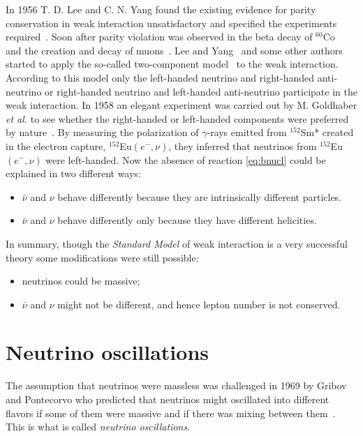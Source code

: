 In 1956 T. D. Lee and C. N. Yang found the existing evidence for parity conservation in weak interaction unsatisfactory and specified the experiments required~\cite{Lee56}. Soon after parity violation was observed in the beta decay of $^{60}$Co~\cite{Wu57} and the creation and decay of muons~\cite{Gar57,Fri57}. Lee and Yang~\cite{Lee57} and some other authors~\cite{Sal57,Lan57} started to apply the so-called two-component model~\cite{Wey29} to the weak interaction. According to this model only the left-handed neutrino and right-handed anti-neutrino or right-handed neutrino and left-handed anti-neutrino participate in the weak interaction. In 1958 an elegant experiment was carried out by M. Goldhaber \textit{et al.} to see whether the right-handed or left-handed components were preferred by nature~\cite{Gol58}. By measuring the polarization of $\gamma$-rays emitted from $^{152}$Sm* created in the electron capture, $^{152}$Eu$(e^-,\nu)$, they inferred that neutrinos from $^{152}$Eu$(e^-,\nu)$ were left-handed. Now the absence of reaction \ref{eq:bnucl} could be explained in two different ways:
\begin{itemize}
\item $\bar{\nu}$ and $\nu$ behave differently because they are   intrinsically different particles.
\item $\bar{\nu}$ and $\nu$ behave differently only because they have   different helicities.
\end{itemize}

In summary, though the \emph{Standard Model} of weak interaction is a very successful theory some modifications were still possible:
\begin{itemize}
\item neutrinos could be massive;
\item $\bar{\nu}$ and $\nu$ might not be different, and hence lepton   number is not conserved.
\end{itemize}


\section{Neutrino oscillations}
\label{sec:osci}
The assumption that neutrinos were massless was challenged in 1969 by Gribov and Pontecorvo who predicted that neutrinos might oscillated into different flavors if some of them were massive and if there was mixing between them~\cite{Gri69}. This is what is called \emph{neutrino oscillations}.

